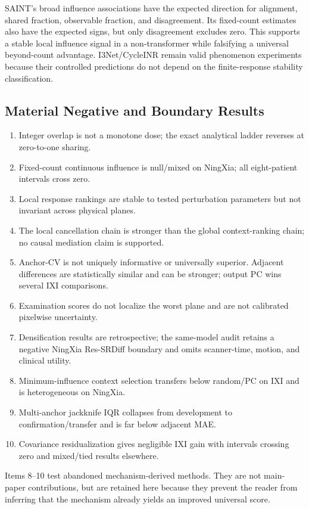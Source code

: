 SAINT's broad influence associations have the expected direction for alignment, shared fraction, observable fraction, and disagreement. Its fixed-count estimates also have the expected signs, but only disagreement excludes zero. This supports a stable local influence signal in a non-transformer while falsifying a universal beyond-count advantage. I3Net/CycleINR remain valid phenomenon experiments because their controlled predictions do not depend on the finite-response stability classification.

\subsection{Material Negative and Boundary Results}
\begin{enumerate}
\item Integer overlap is not a monotone dose; the exact analytical ladder reverses at zero-to-one sharing.
\item Fixed-count continuous influence is null/mixed on NingXia; all eight-patient intervals cross zero.
\item Local response rankings are stable to tested perturbation parameters but not invariant across physical planes.
\item The local cancellation chain is stronger than the global context-ranking chain; no causal mediation claim is supported.
\item Anchor-CV is not uniquely informative or universally superior. Adjacent differences are statistically similar and can be stronger; output PC wins several IXI comparisons.
\item Examination scores do not localize the worst plane and are not calibrated pixelwise uncertainty.
\item Densification results are retrospective; the same-model audit retains a negative NingXia Res-SRDiff boundary and omits scanner-time, motion, and clinical utility.
\item Minimum-influence context selection transfers below random/PC on IXI and is heterogeneous on NingXia.
\item Multi-anchor jackknife IQR collapses from development to confirmation/transfer and is far below adjacent MAE.
\item Covariance residualization gives negligible IXI gain with intervals crossing zero and mixed/tied results elsewhere.
\end{enumerate}

Items 8--10 test abandoned mechanism-derived methods. They are not main-paper contributions, but are retained here because they prevent the reader from inferring that the mechanism already yields an improved universal score.

